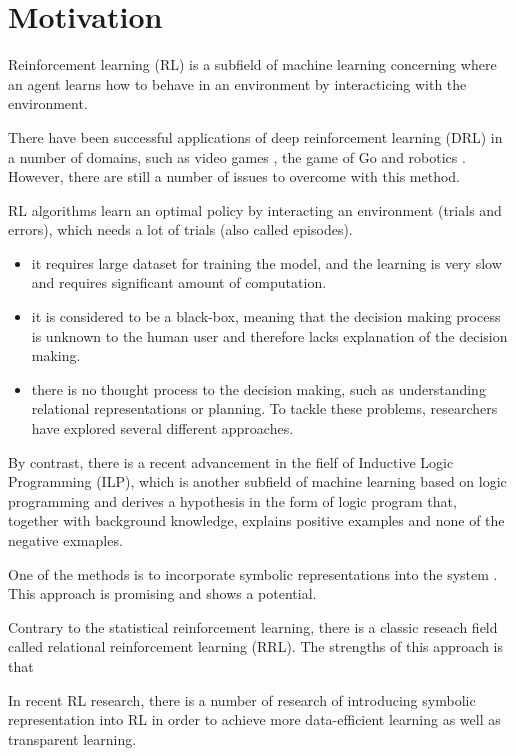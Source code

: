 \section{Motivation}

Reinforcement learning (RL) is a subfield of machine learning concerning where an agent learns how to behave in an environment by interacticing with the environment.

There have been successful applications of deep reinforcement learning (DRL) in a number of domains, 
such as video games \cite{Mnih2015}, the game of Go \cite{Silver2016} and robotics \cite{Levine2015}. 
However, there are still a number of issues to overcome with this method.

RL algorithms learn an optimal policy by interacting an environment (trials and errors), which needs a lot of trials (also called episodes). 

\begin{itemize}
    \item it requires large dataset for training the model, and the learning is very slow and requires significant amount of computation.
    \item it is considered to be a black-box, meaning that the decision making process is unknown to the human user and therefore lacks explanation of the decision making. 
    \item there is no thought process to the decision making, such as understanding relational representations or planning. To tackle these problems, researchers have explored several different approaches.
\end{itemize}

By contrast, there is a recent advancement in the fielf of Inductive Logic Programming (ILP), 
which is another subfield of machine learning based on logic programming and derives a hypothesis in the form of logic program that, together with background knowledge, explains positive examples and none of the negative exmaples. 

One of the methods is to incorporate symbolic representations into the system \cite{Garnelo2016}. This approach is promising and shows a potential.

Contrary to the statistical reinforcement learning, there is a classic reseach field called relational reinforcement learning (RRL). 
The strengths of this approach is that 

In recent RL research, there is a number of research of introducing symbolic representation into RL in order to achieve more data-efficient learning as well as transparent learning. 


